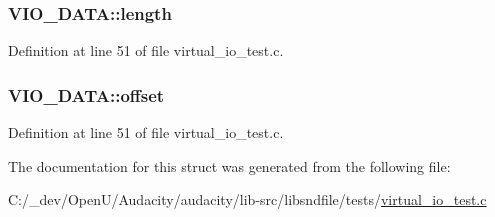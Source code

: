 \subsubsection[{\texorpdfstring{length}{length}}]{ V\+I\+O\+\_\+\+D\+A\+T\+A\+::length}\hypertarget{struct_v_i_o___d_a_t_a_aaa9575a667e07227e5a17faa50e44149}{}\label{struct_v_i_o___d_a_t_a_aaa9575a667e07227e5a17faa50e44149}


Definition at line 51 of file virtual\+\_\+io\+\_\+test.\+c.

\subsubsection[{\texorpdfstring{offset}{offset}}]{ V\+I\+O\+\_\+\+D\+A\+T\+A\+::offset}\hypertarget{struct_v_i_o___d_a_t_a_a0d8d8a08ad9a2abb51d2dfd19bcd16ca}{}\label{struct_v_i_o___d_a_t_a_a0d8d8a08ad9a2abb51d2dfd19bcd16ca}


Definition at line 51 of file virtual\+\_\+io\+\_\+test.\+c.



The documentation for this struct was generated from the following file\+:\begin{DoxyCompactItemize}
\item 
C\+:/\+\_\+dev/\+Open\+U/\+Audacity/audacity/lib-\/src/libsndfile/tests/\hyperlink{virtual__io__test_8c}{virtual\+\_\+io\+\_\+test.\+c}\end{DoxyCompactItemize}
